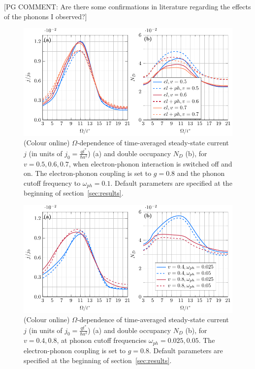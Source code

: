 \documentclass[aps,prb,groupedaddress,showpacs,twocolumn,superscriptaddress,10pt]{revtex4-2}
\newcommand{\pgcomm}[1]{{\color{ao(english)} [PG COMMENT: #1]}}
\begin{document}
\pgcomm{Are there some confirmations in literature regarding the effects of the phonons I observed?}

\begin{figure}[ht] 
\includegraphics[width=\linewidth]{./figures_Paper1/j_vs_omega_mu1_sweep_v_E0_2_eph.pdf}
\caption{(Colour online) $\Omega$-dependence of time-averaged steady-state current $j$ (in units of $j_0=\frac{qt^*}{\hbar a^2}$) (a) and double occupancy $N_D$ (b), for $v=0.5,0.6,0.7$, when electron-phonon interaction is switched off and on. The electron-phonon coupling is set to $g=0.8$ and the phonon cutoff frequency to $\omega_{ph}=0.1$. Default parameters are specified at the beginning of section~\ref{sec:results}.} 
\label{fig:j_vs_omega_mu1_sweep_v_E0_2_eph}
\end{figure} 
 

\begin{figure}[ht] 
\includegraphics[width=\linewidth]{./figures_Paper1/j_vs_omega_mu1_v_0.4_0.8_E0_2_sweep_omegaph.pdf}
\caption{(Colour online) $\Omega$-dependence of time-averaged steady-state current $j$ (in units of $j_0=\frac{qt^*}{\hbar a^2}$) (a) and double occupancy $N_D$ (b), for $v=0.4,0.8$, at  phonon cutoff frequencies $\omega_{ph}=0.025,0.05$. The electron-phonon coupling is set to $g=0.8$. Default parameters are specified at the beginning of section~\ref{sec:results}.} 
\label{fig:j_vs_omega_mu1_v_0.4_0.8_E0_2_sweep_omegaph}
\end{figure} 
 
\end{document}
